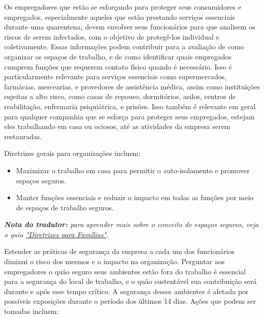 \documentclass[onecolumn,journal]{IEEEtran}
\begin{document}
\begin{multicols}{2}

Os empregadores que estão se esforçando para proteger seus consumidores e empregados, especialmente aqueles que estão prestando serviços essenciais durante uma quarentena, devem envolver seus funcionários para que analisem os riscos de serem infectados, com o objetivo de protegê-los individual e coletivamente. Essas informações podem contribuir para a avaliação de como organizar os espaços de trabalho, e de como identificar quais empregados cumprem funções que requerem contato físico quando é necessário. Isso é particularmente relevante para serviços essenciais como supermercados, farmácias, mercearias, e provedores de assistência médica, assim como instituições sujeitas a alto risco, como casas de repouso, dormitórios, asilos, centros de reabilitação, enfermaria psiquiátrica, e prisões. Isso também é relevante em geral para qualquer companhia que se esforça para proteger seus empregados, estejam eles trabalhando em casa ou ociosos, até as atividades da empresa serem restauradas.

Diretrizes gerais para organizações incluem:

\begin{itemize}
\item
  Maximizar o trabalho em casa para permitir o auto-isolamento e promover espaços seguros.
\item
  Manter funções essenciais e reduzir o impacto em todas as funções por meio de espaços de trabalho seguros.
\end{itemize}

\textit{\textbf{Nota do tradutor:} para aprender mais sobre o conceito de espaços seguros, veja o guia  \href{https://github.com/necsi/source-translation-text/raw/master/portuguese-br/pdf/Family_port-br.pdf}{"Diretrizes para Famílias"}.}

Estender as práticas de segurança da empresa a cada um dos funcionários diminui o risco dos mesmos e o impacto na organização. Perguntar aos empregadores o quão seguro seus ambientes estão fora do trabalho é essencial para a segurança do local de trabalho, e o quão sustentável sua contribuição será durante e após esse tempo crítico. A segurança desses ambientes é afetada por possíveis exposições durante o período dos últimos 14 dias. Ações que podem ser tomadas incluem:


\end{multicols}
\end{document}
